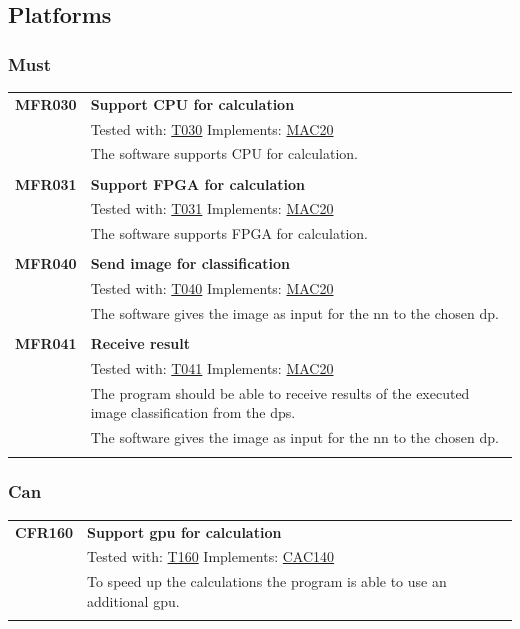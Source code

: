 \documentclass[parskip=full]{scrartcl}
\begin{document}
\subsection{Platforms}
\subsubsection{Must}
\begin{tabular}{p{2cm}p{11.4cm}}
\textbf {MFR030}\hypertarget{MFR030} & \textbf{Support CPU for calculation} \\
& Tested with: \hyperlink{T030}{T030} Implements: \hyperlink{MAC20}{MAC20} \\
& The software supports CPU for calculation. \\
& \\
\textbf {MFR031}\hypertarget{MFR031}  & \textbf{Support FPGA for calculation} \\
& Tested with: \hyperlink{T031}{T031} Implements: \hyperlink{MAC20}{MAC20} \\
& The software supports FPGA for calculation. \\
& \\
\textbf {MFR040} \hypertarget{MFR040}& \textbf{Send image for classification} \\
& Tested with: \hyperlink{T040}{T040} Implements: \hyperlink{MAC20}{MAC20} \\
& The software gives the image as input for the \gls{nn} to the chosen \gls{dp}. \\
& \\
\textbf {MFR041} \hypertarget{MFR041}& \textbf{Receive result} \\
& Tested with: \hyperlink{T041}{T041} Implements: \hyperlink{MAC20}{MAC20} \\
& The program should be able to receive results of the executed \gls{image classification} from the \glspl{dp}. \\
& The software gives the image as input for the {nn} to the chosen \gls{dp}. \\
& \\
\end{tabular}
\subsubsection{Can}
\begin{tabular}{p{2cm}p{11.4cm}}
\textbf {CFR160} \hypertarget{CFR160} & \textbf{Support \gls{gpu} for calculation} \\
& Tested with: \hyperlink{T160}{T160} Implements: \hyperlink{CAC140}{CAC140} \\
& To speed up the calculations the program is able to use an additional \gls{gpu}.\\
& \\
\end{tabular}
\end{document}
